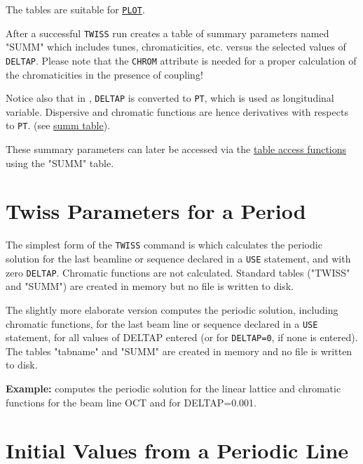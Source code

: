 The tables are suitable for \hyperref[chap:plot]{\tt PLOT}.

After a successful {\tt TWISS} run \madx creates a 
table of summary parameters named "SUMM" which includes tunes,
chromaticities, etc. versus the selected values of {\tt DELTAP}.
Please note that the {\tt CHROM} attribute is needed
for a proper calculation of the chromaticities in the presence of
coupling!

Notice also that in \madx, {\tt DELTAP} is converted to {\tt PT}, which is used 
as longitudinal variable. 
Dispersive and chromatic functions are hence derivatives with
respects to {\tt PT}. (see \hyperref[subsec:tables_summ]{summ table}). 

These summary parameters can later be accessed via the 
\hyperref[chap:tables]{table access functions} using the "SUMM" table.  

\section{Twiss Parameters for a Period}
\label{sec:twissperiod}

The simplest form of the {\tt TWISS} command is
which calculates the periodic solution for the last beamline or sequence
declared in a {\tt USE} statement, and with zero {\tt DELTAP}.
Chromatic functions are not calculated. 
Standard tables ("TWISS" and "SUMM") are created in memory but no file
is written to disk. 

The slightly more elaborate version 
computes the periodic solution, including chromatic functions, for the last beam
line or sequence declared in a {\tt USE} statement, for all values of
DELTAP entered (or for {\tt DELTAP=0}, if none is entered). 
The tables "tabname" and "SUMM" are created in memory and no file is
written to disk. 

{\bf Example:} 
computes the periodic solution for the linear lattice and
chromatic functions for the beam line OCT and for DELTAP=0.001. 


\section{Initial Values from a Periodic Line}
\label{sec:twissinitial}

